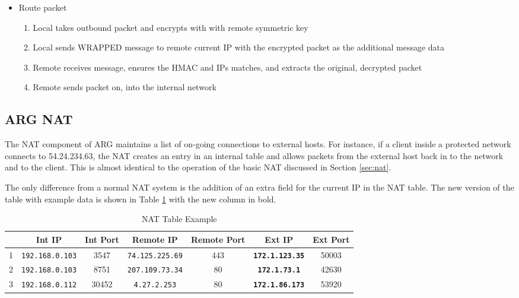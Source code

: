 \begin{itemize}
\item Route packet
	 \begin{enumerate}
		 \item Local takes outbound packet and encrypts with with remote symmetric key
		 \item Local sends WRAPPED message to remote current IP with the encrypted packet as the additional message data
		 \item Remote receives message, ensures the HMAC and IPs matches, and extracts the original, decrypted packet
		 \item Remote sends packet on, into the internal network
	 \end{enumerate}
\end{itemize}

\subsection{\ac{ARG} \ac{NAT}}
\label{sec:arg_nat}
\par The \ac{NAT} component of \ac{ARG} maintains a list of on-going connections to external hosts. For instance, if a client inside a protected network connects to 54.24.234.63, the \ac{NAT} creates an entry in an internal table and allows packets from the external host back in to the network and to the client. This is almost identical to the operation of the basic \ac{NAT} discussed in Section \ref{sec:nat}.

\par The only difference from a normal \ac{NAT} system is the addition of an extra field for the current \ac{IP} in the \ac{NAT} table. The new version of the table with example data is shown in Table \ref{tab:arg_nat_example} with the new column in bold.

\begin{table}
\caption{NAT Table Example}
\label{tab:arg_nat_example}
\centering
\begin{tabular}{r|cccccc}
  & Int IP & Int Port & Remote IP & Remote Port & \textbf{Ext IP} & Ext Port\\
\hline
1 & \texttt{192.168.0.103} & 3547 & \texttt{74.125.225.69} & 443 & \textbf{\texttt{172.1.123.35}} & 50003\\
2 & \texttt{192.168.0.103} & 8751 & \texttt{207.109.73.34} & 80 & \textbf{\texttt{172.1.73.1}} & 42630\\
3 & \texttt{192.168.0.112} & 30452 & \texttt{4.27.2.253} & 80 & \textbf{\texttt{172.1.86.173}} & 53920
\end{tabular}
\end{table}


